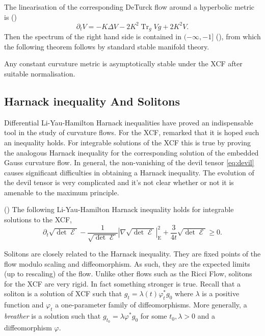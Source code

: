 \documentclass{cambridge7a}
\renewcommand{\~}{\tilde}
\renewcommand{\-}{\bar}
\newcommand{\8}{\infty}
\newcommand{\abs}[1]{\left\lvert{#1}\right\rvert}
\DeclareMathOperator{\Tr}{Tr}
\DeclareMathOperator{\Ein}{E}
\DeclareMathOperator{\opEin}{\mathcal{E}}
\begin{document}
The linearisation of the corresponding DeTurck flow around a hyperbolic metric is (\cite[Lemma 2]{MR2448593})
\[
\partial_t V = -K \Delta V -2K^2 \Tr_g V g + 2K^2 V.
\]
Then the spectrum of the right hand side is contained in \((-\infty, -1]\) (\cite[Section 5]{MR2448593}), from which the following theorem follows by standard stable manifold theory.

\begin{thm}[{\cite[Theorem 4]{MR2448593}}]
\label{thm:hyperbolic_stability}

Any constant curvature metric is asymptotically stable under the XCF after suitable normalisation.
\end{thm}

\subsection{Harnack inequality And Solitons}
\label{subsec:xcf_harnack_solitons}

Differential Li-Yau-Hamilton Harnack inequalities have proved an indispensable tool in the study of curvature flows. For the XCF, \cite[p. 9]{MR2055396} remarked that it is hoped such an inequality holds. For integrable solutions of the XCF this is true by proving the analogous Harnack inequality for the corresponding solution of the embedded Gauss curvature flow. In general, the non-vanishing of the devil tensor \eqref{eq:devil} causes significant difficulties in obtaining a Harnack inequality. The evolution of the devil tensor is very complicated and it's not clear whether or not it is amenable to the  maximum principle.

\begin{thm}(\cite[Section 6]{BIS4})
\label{thm:harnack}
The following Li-Yau-Hamilton Harnack inequality holds for integrable solutions to the XCF,
\[
\partial_t \sqrt{\det\opEin} - \frac{1}{\sqrt{\det\opEin}} \abs{\nabla \sqrt{\det\opEin}}_{\Ein}^2 + \frac{3}{4t}\sqrt{\det\opEin} \geq 0.
\]
\end{thm}

Solitons are closely related to the Harnack inequality. They are fixed points of the flow modulo scaling and diffeomorphism. As such, they are the expected limits (up to rescaling) of the flow. Unlike other flows such as the Ricci Flow, solitons for the XCF are very rigid. In fact something stronger is true. Recall that a soliton is a solution of XCF such that \(g_t = \lambda(t) \varphi_t^{\ast} g_0\) where \(\lambda\) is a positive function and \(\varphi_t\) a one-parameter family of diffeomorphisms. More generally, a \emph{breather} is a solution such that \(g_{t_0} = \lambda \varphi^{\ast} g_0\) for some \(t_0 ,\lambda > 0\) and a diffeomorphism \(\varphi\).
\end{document}
